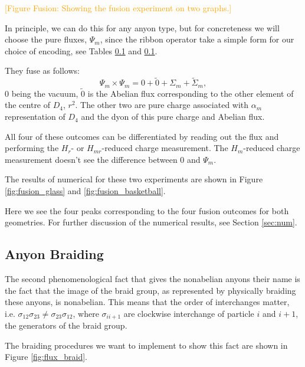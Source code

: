\documentclass[two column]{article}
\newcommand{\todo}[1]{\textcolor{orange}{[#1]}}
\begin{document}
\todo{Figure Fusion: Showing the fusion experiment on two graphs.}

In principle, we can do this for any anyon type, but for concreteness we will choose the pure fluxes, $\Psi_m$, since the ribbon operator take a simple form for our choice of encoding, see Tables \ref{} and \ref{}.

They fuse as follows: $$\Psi_m \times \Psi_m = 0 + \tilde{0} + \Sigma_m + \tilde{\Sigma}_m,$$ $0$ being the vacuum, $\tilde{0}$ is the Abelian flux corresponding to the other element of the centre of $D_4$, $r^2$. The other two are pure charge associated with $\alpha_m$ representation of $D_4$ and the dyon of this pure charge and Abelian flux.

All four of these outcomes can be differentiated by reading out the flux and performing the $H_r$- or $H_{mr}$-reduced charge measurement. The $H_m$-reduced charge measurement doesn't see the difference between $0$ and $\Psi_m$.

The results of numerical for these two experiments are shown in Figure \ref{fig:fusion_glass} and \ref{fig:fusion_basketball}.

Here we see the four peaks corresponding to the four fusion outcomes for both geometries.
For further discussion of the numerical results, see Section \ref{sec:num}.

\subsection{Anyon Braiding}

The second phenomenological fact that gives the nonabelian anyons their name is the fact that the image of the braid group, as represented by physically braiding these anyons, is nonabelian. 
This means that the order of interchanges matter, i.e. $\sigma_{12}\sigma_{23} \neq \sigma_{23}\sigma_{12}$, where $\sigma_{ii+1}$ are clockwise interchange of particle $i$ and $i+1$, the generators of the braid group.

The braiding procedures we want to implement to show this fact are shown in Figure \ref{fig:flux_braid}.
\end{document}
